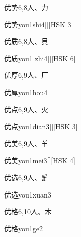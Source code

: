 \begin{Entry}{优势}{6,8}{⼈、⼒}
  \begin{Phonetics}{优势}{you1shi4}[][HSK 3]
  \end{Phonetics}
\end{Entry}

\begin{Entry}{优质}{6,8}{⼈、⾙}
  \begin{Phonetics}{优质}{you1 zhi4}[][HSK 6]
  \end{Phonetics}
\end{Entry}

\begin{Entry}{优厚}{6,9}{⼈、⼚}
  \begin{Phonetics}{优厚}{you1hou4}
  \end{Phonetics}
\end{Entry}

\begin{Entry}{优点}{6,9}{⼈、⽕}
  \begin{Phonetics}{优点}{you1dian3}[][HSK 3]
  \end{Phonetics}
\end{Entry}

\begin{Entry}{优美}{6,9}{⼈、⽺}
  \begin{Phonetics}{优美}{you1mei3}[][HSK 4]
  \end{Phonetics}
\end{Entry}

\begin{Entry}{优选}{6,9}{⼈、⾡}
  \begin{Phonetics}{优选}{you1xuan3}
  \end{Phonetics}
\end{Entry}

\begin{Entry}{优格}{6,10}{⼈、⽊}
  \begin{Phonetics}{优格}{you1ge2}
  \end{Phonetics}
\end{Entry}

